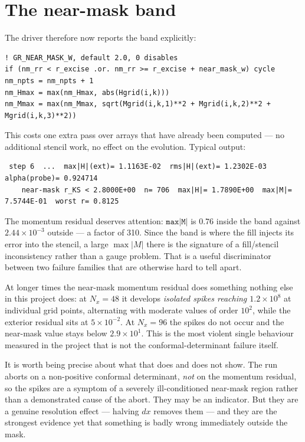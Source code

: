 \documentclass[11pt,openany]{book}
\begin{document}
\section{The near-mask band}

The driver therefore now reports the band explicitly:
\begin{lstlisting}
! GR_NEAR_MASK_W, default 2.0, 0 disables
if (nm_rr < r_excise .or. nm_rr >= r_excise + near_mask_w) cycle
nm_npts = nm_npts + 1
nm_Hmax = max(nm_Hmax, abs(Hgrid(i,k)))
nm_Mmax = max(nm_Mmax, sqrt(Mgrid(i,k,1)**2 + Mgrid(i,k,2)**2 + Mgrid(i,k,3)**2))
\end{lstlisting}

This costs one extra pass over arrays that have already been computed --- no
additional stencil work, no effect on the evolution. Typical output:

\begin{lstlisting}
 step 6  ...  max|H|(ext)= 1.1163E-02  rms|H|(ext)= 1.2302E-03  alpha(probe)= 0.924714
    near-mask r_KS < 2.8000E+00  n= 706  max|H|= 1.7890E+00  max|M|= 7.5744E-01  worst r= 0.8125
\end{lstlisting}

The momentum residual deserves attention: $\texttt{max|M|}$ is $0.76$ inside
the band against $2.44\times10^{-3}$ outside --- a factor of 310. Since the band
is where the fill injects its error into the stencil, a large $\max|M|$ there
is the signature of a fill/stencil inconsistency rather than a gauge problem.
That is a useful discriminator between two failure families that are otherwise
hard to tell apart.

\gotcha
At longer times the near-mask momentum residual does something nothing else
in this project does: at $N_x = 48$ it develops \emph{isolated spikes reaching
$1.2\times10^{8}$} at individual grid points, alternating with moderate values
of order $10^{2}$, while the exterior residual sits at $5\times10^{-2}$. At
$N_x = 96$ the spikes do not occur and the near-mask value stays below
$2.9\times10^{1}$. This is the most violent single behaviour measured in the
project that is not the conformal-determinant failure itself.

It is worth being precise about what that does and does not show. The run
aborts on a non-positive conformal determinant, \emph{not} on the momentum
residual, so the spikes are a symptom of a severely ill-conditioned near-mask
region rather than a demonstrated cause of the abort. They may be an
indicator. But they are a genuine resolution effect --- halving $dx$ removes
them --- and they are the strongest evidence yet that something is badly wrong
immediately outside the mask.
\end{document}
